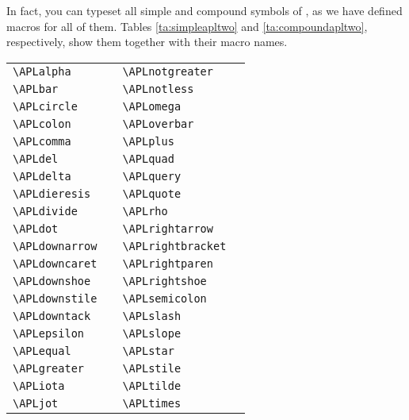 In fact, you can typeset all simple and
compound symbols of , as we have
defined macros for all of them.
Tables \ref{ta:simpleapltwo} and \ref{ta:compoundapltwo},
respectively, show them together with their macro names.
 
\begin{table}[htbf] \centering\small
\begin{tabular}{|lc|lc|}\hline
\verb+\APLalpha+ & \APLalpha	&   \verb+\APLnotgreater+ & \APLnotgreater \\
\verb+\APLbar+ & \APLbar	&   \verb+\APLnotless+ & \APLnotless \\
\verb+\APLcircle+ & \APLcircle	&   \verb+\APLomega+	& \APLomega\\
\verb+\APLcolon+ & \APLcolon	&   \verb+\APLoverbar+	& \APLoverbar\\
\verb+\APLcomma+ & \APLcomma	&   \verb+\APLplus+ & \APLplus\\
\verb+\APLdel+ & \APLdel	&   \verb+\APLquad+ & \APLquad\\
\verb+\APLdelta+ & \APLdelta	&   \verb+\APLquery+ &   \APLquery\\
\verb+\APLdieresis+ & \APLdieresis	&   \verb+\APLquote+ & \APLquote\\
\verb+\APLdivide+ & \APLdivide	&   \verb+\APLrho+ &   \APLrho\\
\verb+\APLdot+ & \APLdot	&   \verb+\APLrightarrow+ & \APLrightarrow\\
\verb+\APLdownarrow+ & \APLdownarrow	&   \verb+\APLrightbracket+ & \APLrightbracket\\
\verb+\APLdowncaret+ & \APLdowncaret	&   \verb+\APLrightparen+ & \APLrightparen\\
\verb+\APLdownshoe+ & \APLdownshoe	&   \verb+\APLrightshoe+	& \APLrightshoe\\
\verb+\APLdownstile+ & \APLdownstile	&   \verb+\APLsemicolon+ & \APLsemicolon\\
\verb+\APLdowntack+ & \APLdowntack	&   \verb+\APLslash+ & \APLslash\\
\verb+\APLepsilon+ & \APLepsilon	&   \verb+\APLslope+ & \APLslope\\
\verb+\APLequal+ & \APLequal		&   \verb+\APLstar+ & \APLstar\\
\verb+\APLgreater+ & \APLgreater	&   \verb+\APLstile+ & \APLstile\\
\verb+\APLiota+	& \APLiota		&   \verb+\APLtilde+ & \APLtilde\\
\verb+\APLjot+ & \APLjot		&   \verb+\APLtimes+ & \APLtimes\\

\end{tabular}
\end{table}
